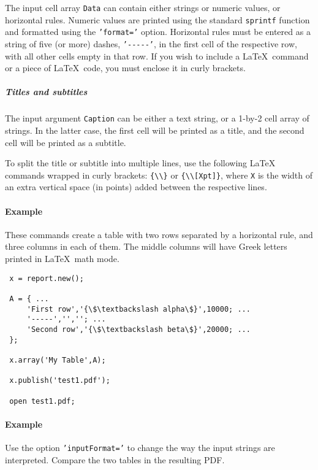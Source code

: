  The input cell array \texttt{Data} can contain either strings or numeric
 values, or horizontal rules. Numeric values are printed using the
 standard \texttt{sprintf} function and formatted using the
 \texttt{'format='} option. Horizontal rules must be entered as a string
 of five (or more) dashes, \texttt{'-{}-{}-{}-{}-'}, in the first cell of
 the respective row, with all other cells empty in that row. If you wish
 to include a \LaTeX~command or a piece of \LaTeX~code, you must enclose
 it in curly brackets.
 
 \subparagraph{Titles and subtitles}
 
 The input argument \texttt{Caption} can be either a text string, or a
 1-by-2 cell array of strings. In the latter case, the first cell will be
 printed as a title, and the second cell will be printed as a subtitle.
 
 To split the title or subtitle into multiple lines, use the following
 LaTeX commands wrapped in curly brackets:
 \texttt{\{\textbackslash{}\textbackslash{}\}} or
 \texttt{\{\textbackslash{}\textbackslash{}{[}Xpt{]}\}}, where \texttt{X}
 is the width of an extra vertical space (in points) added between the
 respective lines.
 
 \paragraph{Example}
 
 These commands create a table with two rows separated by a horizontal
 rule, and three columns in each of them. The middle columns will have
 Greek letters printed in \LaTeX~math mode.
 
 \begin{verbatim}
 x = report.new();
 
 A = { ...
     'First row','{\$\textbackslash alpha\$}',10000; ...
     '-----','',''; ...
     'Second row','{\$\textbackslash beta\$}',20000; ...
 };
 
 x.array('My Table',A);
 
 x.publish('test1.pdf');
 
 open test1.pdf;
 \end{verbatim}
 
 \paragraph{Example}
 
 Use the option \texttt{'inputFormat='} to change the way the input
 strings are interpreted. Compare the two tables in the resulting PDF.
 
